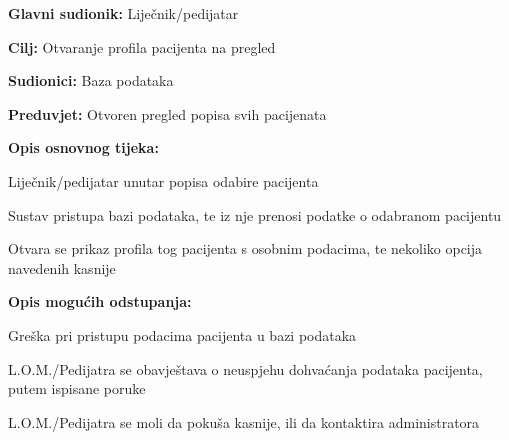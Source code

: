					\noindent {}
					\begin{packed_item}
						
						\item \textbf{Glavni sudionik: }Liječnik/pedijatar
						\item  \textbf{Cilj:} Otvaranje profila pacijenta na pregled
						\item  \textbf{Sudionici:} Baza podataka
						\item  \textbf{Preduvjet:} Otvoren pregled popisa svih pacijenata
						\item  \textbf{Opis osnovnog tijeka:}
						
						\item[] \begin{packed_enum}
							
							\item Liječnik/pedijatar unutar popisa odabire pacijenta
							\item Sustav pristupa bazi podataka, te iz nje prenosi podatke o odabranom pacijentu
							\item Otvara se prikaz profila tog pacijenta s osobnim podacima, te nekoliko opcija navedenih kasnije
						\end{packed_enum}
						\item  \textbf{Opis mogućih odstupanja:}
						\item[] \begin{packed_item}
							
							\item[2.a] Greška pri pristupu podacima pacijenta u bazi podataka
							\item[] \begin{packed_enum}
								
								\item L.O.M./Pedijatra se obavještava o neuspjehu dohvaćanja podataka pacijenta, putem ispisane poruke
								\item L.O.M./Pedijatra se moli da pokuša kasnije, ili da kontaktira administratora
								
							\end{packed_enum}
						\end{packed_item}
					\end{packed_item}
					
